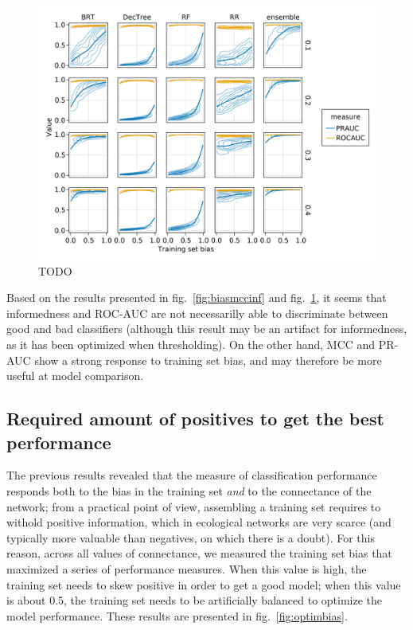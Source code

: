 \documentclass[10pt,oneside]{article}
\makeatletter
\def\maxwidth{\ifdim\Gin@nat@width>\linewidth\linewidth
\else\Gin@nat@width\fi}
\let\Oldincludegraphics\includegraphics
\renewcommand{\includegraphics}[1]{\Oldincludegraphics[width=\maxwidth]{#1}}
\makeatother
\begin{document}
\begin{figure}
\hypertarget{fig:biasrocpr}{%
\centering
\includegraphics{figures/bias_roc_pr.png}
\caption{TODO}\label{fig:biasrocpr}
}
\end{figure}

Based on the results presented in fig.~\ref{fig:biasmccinf} and
fig.~\ref{fig:biasrocpr}, it seems that informedness and ROC-AUC are not
necessarilly able to discriminate between good and bad classifiers
(although this result may be an artifact for informedness, as it has
been optimized when thresholding). On the other hand, MCC and PR-AUC
show a strong response to training set bias, and may therefore be more
useful at model comparison.

\hypertarget{required-amount-of-positives-to-get-the-best-performance}{%
\subsection{Required amount of positives to get the best
performance}\label{required-amount-of-positives-to-get-the-best-performance}}

The previous results revealed that the measure of classification
performance responds both to the bias in the training set \emph{and} to
the connectance of the network; from a practical point of view,
assembling a training set requires to withold positive information,
which in ecological networks are very scarce (and typically more
valuable than negatives, on which there is a doubt). For this reason,
across all values of connectance, we measured the training set bias that
maximized a series of performance measures. When this value is high, the
training set needs to skew positive in order to get a good model; when
this value is about 0.5, the training set needs to be artificially
balanced to optimize the model performance. These results are presented
in fig.~\ref{fig:optimbias}.
\end{document}
